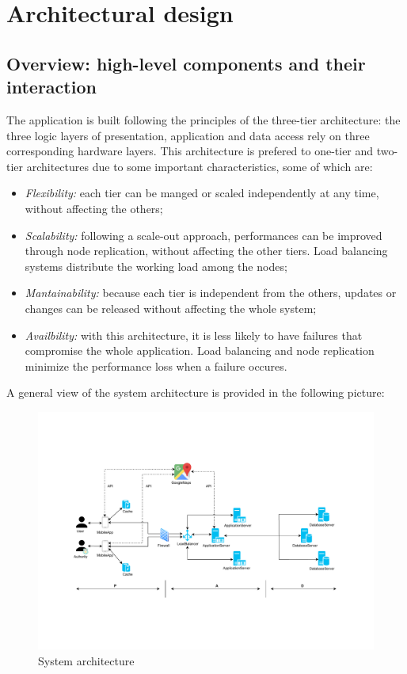 \documentclass[12pt,a4paper]{report}
\begin{document}
	\chapter{Architectural design}
		\section{Overview:	high-level	components	and	their	interaction} 
	The application is built following the principles of the three-tier architecture: the three logic layers of presentation, 				application and data access rely on three corresponding hardware layers. This architecture is prefered to one-tier and 			two-tier architectures due to some important characteristics, some of which are:
	\begin{itemize}
	\item \emph{Flexibility:} each tier can be manged or scaled independently at any time, without affecting the others;
	\item \emph{Scalability:} following a scale-out approach, performances can be improved through node replication, without affecting the other tiers.
	Load balancing systems distribute the working load among the nodes;
	\item \emph{Mantainability:} because each tier is independent from the others, updates or changes can be released
	without affecting the whole system;
	\item \emph{Availbility:} with this architecture, it is less likely to have failures that compromise the whole application.
	Load balancing and node replication minimize the performance loss when a failure occures.
	\end{itemize}
	A general view of the system architecture is provided in the following picture:
	\begin{figure}[H]
				\includegraphics[scale = 0.6, center]{sysarch}
				\caption{System architecture}
		\end{figure}
\end{document}
